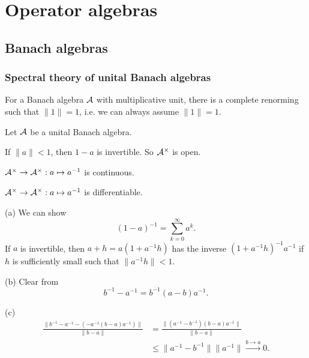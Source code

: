 \documentclass{../../large}
\begin{document}
\part{Operator algebras}
\chapter{Banach algebras}

\section{Spectral theory of unital Banach algebras}

\begin{prb}
For a Banach algebra $\mathcal{A}$ with multiplicative unit, there is a complete renorming such that $\|1\|=1$, i.e. we can always assume $\|1\|=1$.

Let $\mathcal{A}$ be a unital Banach algebra.
\begin{parts}
\item If $\|a\|<1$, then $1-a$ is invertible. So $\mathcal{A}^\times$ is open.
\item $\mathcal{A}^\times\to\mathcal{A}^\times:a\mapsto a^{-1}$ is continuous.
\item $\mathcal{A}^\times\to\mathcal{A}^\times:a\mapsto a^{-1}$ is differentiable.
\end{parts}
\end{prb}
\begin{pf}
(a)
We can show
\[(1-a)^{-1}=\sum_{k=0}^\infty a^k.\]
If $a$ is invertible, then $a+h=a(1+a^{-1}h)$ has the inverse $(1+a^{-1}h)^{-1}a^{-1}$ if $h$ is sufficiently small such that $\|a^{-1}h\|<1$.

(b)
Clear from
\[b^{-1}-a^{-1}=b^{-1}(a-b)a^{-1}.\]

(c)
\begin{align*}
\frac{\|b^{-1}-a^{-1}-(-a^{-1}(b-a)a^{-1})\|}{\|b-a\|}
&=\frac{\|(a^{-1}-b^{-1})(b-a)a^{-1}\|}{\|b-a\|}\\
&\le\|a^{-1}-b^{-1}\|\|a^{-1}\|\xrightarrow{b\to a}0.
\end{align*}
\end{pf}
\end{document}
